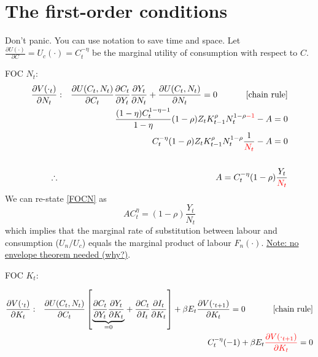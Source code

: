 \section{The first-order conditions}
Don't panic. You can use notation to save time and space. Let $\frac{\partial{U(\cdot)}}{\partial{C}} = U_c(\cdot) = C_t^{-\eta}$ be the marginal utility of consumption with respect to $C$. 

FOC $N_t$:
\begin{eqnarray} \nonumber
\frac{\partial V(\cdot_t)}{\partial N_t} &:& \frac{\partial U(C_t,N_t)}{\partial C_t}\frac{\partial C_t}{\partial Y_t}\frac{\partial Y_t}{\partial N_t} + \frac{\partial U(C_t,N_t)}{\partial N_t}= 0 ~~~~~~~~~~ \text{[chain rule]} \\ \nonumber
 && \frac{(1-\eta)C_t^{1-\eta -1}}{1-\eta}(1-\rho)Z_{t}K^{\rho}_{t-1}N_t^{1-\rho {\color{red}{- 1}}} - A = 0  \\ \nonumber
&& {C_t^{-\eta}}(1-\rho)Z_{t}K^{\rho}_{t-1}N_t^{1-\rho}{\frac{1}{\color{red}{N_t}}} - A = 0\\ \nonumber
\\ \label{FOCN}
\therefore & & A = {C_t^{-\eta}}(1-\rho){\frac{Y_t}{\color{red}{N_t}}} 
\end{eqnarray}
We can re-state \eqref{FOCN} as $$A{C_t^{\eta}} = (1-\rho)\frac{Y_t}{N_t}$$ which implies that the marginal rate of substitution between labour and consumption ($U_n/U_c$) equals the marginal product of labour $F_n(\cdot)$. \underline{Note: no envelope theorem needed (why?)}. \vskip0.25in

FOC $K_{t}$:

\begin{eqnarray} 
 \nonumber
\frac{\partial V(\cdot_t)}{\partial K_{t}} &:& \frac{\partial U(C_t,N_t)}{\partial C_t} \left[ \underset{=0}{\underbrace{\frac{\partial C_t}{\partial Y_t}\frac{\partial Y_t}{\partial K_{t}} }} + \frac{\partial C_t}{\partial I_t}\frac{\partial I_t}{\partial K_{t}}  \right] + \beta{E_t}\frac{\partial{V(\cdot_{t+1})}}{\partial{K_{t}}} = 0 ~~~~~~~~~~ \text{[chain rule]}  \\ \label{FOCK}  
&& C_{t}^{-\eta} (- 1)  + \beta{E_t}{\color{red}{\frac{\partial{V(\cdot_{t+1})}}{\partial{K_{t}}} }} = 0 
\end{eqnarray}

